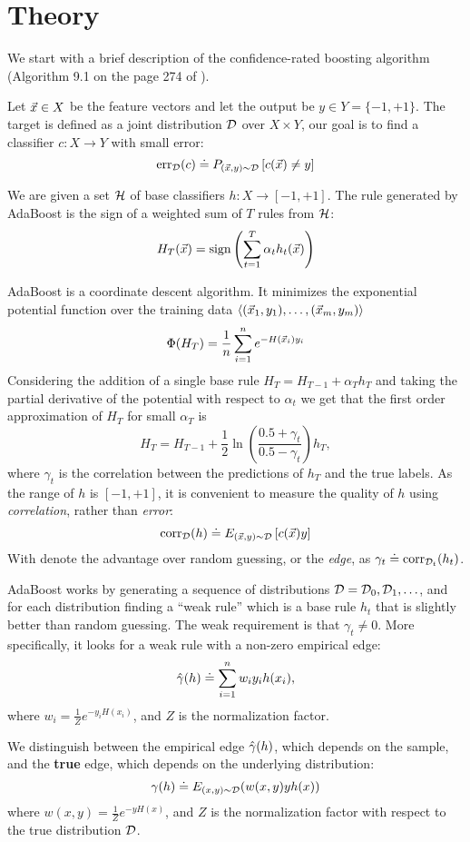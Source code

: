 \section{Theory}\label{sec:theory}
We start with a brief description of the confidence-rated boosting
algorithm (Algorithm 9.1 on the page 274 of \cite{schapire_boosting:_2012}).

Let $\vec{x} \in X$ be the feature vectors and let the output be $y \in
Y= \{-1,+1\}$. The target is defined as a joint distribution ${\cal D}$ over
$X \times Y$, our goal is to find a classifier $c: X \to Y$ with small
error:
$$\mbox{err}_{{\cal D}}(c) \doteq P_{(\vec{x},y)\sim {\cal D}}\left[c(\vec{x}) \neq y \right]$$

We are given a set $\mathcal{H}$ of base classifiers $h:X \to [-1,+1]$. The
rule generated by AdaBoost is the sign of a weighted sum of $T$ rules from
$\mathcal{H}$:
\[
H_T(\vec{x}) = \mbox{sign} \left( \sum_{t=1}^T \alpha_t h_t(\vec{x}) \right)
\]

AdaBoost is a coordinate descent algorithm. It minimizes the exponential
potential function over the training data $\langle(\vec{x}_1,y_1),\ldots,(\vec{x}_m,y_m)\rangle$
\[
\Phi(H_T) = \frac{1}{n} \sum_{i=1}^n e^{-H(\vec{x}_i)y_i}
\]
Considering the addition of a single base rule $H_T=H_{T-1}+\alpha_T h_T$
and taking the partial derivative of the potential with respect
to $\alpha_t$ we get that the first order approximation of $H_T$
for small $\alpha_T$ is
\[
H_T = H_{T-1} + \frac{1}{2} \ln \left( \frac{0.5 + \gamma_t}{0.5 - \gamma_t} \right) h_T,
\]
where $\gamma_t$ is the correlation between the predictions of $h_T$ and
the true labels.
As the range of $h$ is $[-1,+1]$, it is convenient to
measure the quality of $h$ using {\em correlation}, rather than {\em
  error}:
$$\mbox{corr}_{{\cal D}}(h) \doteq E_{(\vec{x},y) \sim {\cal D}}\left[c(\vec{x})y \right]$$
With denote the advantage over random guessing, or the \textit{edge}, as
$\gamma_t \doteq \mbox{corr}_{{\cal D}_t}(h_t)$.

AdaBoost works by generating a sequence of distributions
${\cal D}={\cal D}_0, {\cal D}_1,\ldots$, and for each distribution finding a
``weak rule'' which is a base rule $h_t$ that is slightly better than
random guessing. The weak requirement is that 
$\gamma_t \neq 0$.
More specifically, it looks for a weak rule
with a non-zero empirical edge:
\begin{equation} \label{eqn:gamma_emp}
\hat{\gamma}(h) \doteq  \sum_{i=1}^n w_i y_i h(x_i),
\end{equation}
where $w_i = \frac{1}{Z}e^{- y_i H(x_i)}$, and $Z$ is the normalization factor.

We distinguish between the empirical edge $\hat{\gamma}(h)$, which depends on the sample,
and the \textbf{true} edge, which depends on
the underlying distribution:
\begin{equation} \label{eqn:gamma_true}
\gamma(h) \doteq E_{(x,y) \sim {\cal D}}( w(x,y) y h(x))
\end{equation}
where $w(x,y)=\frac{1}{Z}  e^{- y H(x)}$,
and $Z$ is the normalization factor with respect to the true distribution ${\cal D}$.


